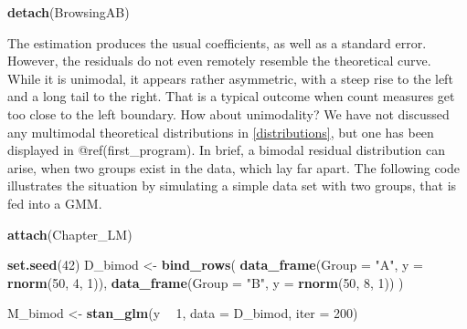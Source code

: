 \documentclass[]{svmono}
\newenvironment{Shaded}{\begin{snugshade}}{\end{snugshade}}
\newcommand{\KeywordTok}[1]{\textcolor[rgb]{0.13,0.29,0.53}{\textbf{#1}}}
\newcommand{\DataTypeTok}[1]{\textcolor[rgb]{0.13,0.29,0.53}{#1}}
\newcommand{\DecValTok}[1]{\textcolor[rgb]{0.00,0.00,0.81}{#1}}
\newcommand{\StringTok}[1]{\textcolor[rgb]{0.31,0.60,0.02}{#1}}
\newcommand{\OperatorTok}[1]{\textcolor[rgb]{0.81,0.36,0.00}{\textbf{#1}}}
\newcommand{\NormalTok}[1]{#1}
\begin{document}
\begin{Shaded}
\begin{Highlighting}[]
\KeywordTok{detach}\NormalTok{(BrowsingAB)}
\end{Highlighting}
\end{Shaded}

The estimation produces the usual coefficients, as well as a standard
error. However, the residuals do not even remotely resemble the
theoretical curve. While it is unimodal, it appears rather asymmetric,
with a steep rise to the left and a long tail to the right. That is a
typical outcome when count measures get too close to the left boundary.
How about unimodality? We have not discussed any multimodal theoretical
distributions in \ref{distributions}, but one has been displayed in
@ref(first\_program). In brief, a bimodal residual distribution can
arise, when two groups exist in the data, which lay far apart. The
following code illustrates the situation by simulating a simple data set
with two groups, that is fed into a GMM.

\begin{Shaded}
\begin{Highlighting}[]
\KeywordTok{attach}\NormalTok{(Chapter_LM)}
\end{Highlighting}
\end{Shaded}

\begin{Shaded}
\begin{Highlighting}[]
\KeywordTok{set.seed}\NormalTok{(}\DecValTok{42}\NormalTok{)}
\NormalTok{D_bimod <-}\StringTok{ }
\StringTok{  }\KeywordTok{bind_rows}\NormalTok{(}
    \KeywordTok{data_frame}\NormalTok{(}\DataTypeTok{Group =} \StringTok{"A"}\NormalTok{, }\DataTypeTok{y =} \KeywordTok{rnorm}\NormalTok{(}\DecValTok{50}\NormalTok{, }\DecValTok{4}\NormalTok{, }\DecValTok{1}\NormalTok{)),}
    \KeywordTok{data_frame}\NormalTok{(}\DataTypeTok{Group =} \StringTok{"B"}\NormalTok{, }\DataTypeTok{y =} \KeywordTok{rnorm}\NormalTok{(}\DecValTok{50}\NormalTok{, }\DecValTok{8}\NormalTok{, }\DecValTok{1}\NormalTok{))}
\NormalTok{  )}
\end{Highlighting}
\end{Shaded}

\begin{Shaded}
\begin{Highlighting}[]
\NormalTok{M_bimod <-}\StringTok{ }\KeywordTok{stan_glm}\NormalTok{(y }\OperatorTok{~}\StringTok{ }\DecValTok{1}\NormalTok{, }\DataTypeTok{data =}\NormalTok{ D_bimod, }\DataTypeTok{iter =} \DecValTok{200}\NormalTok{)}
\end{Highlighting}
\end{Shaded}
\end{document}
